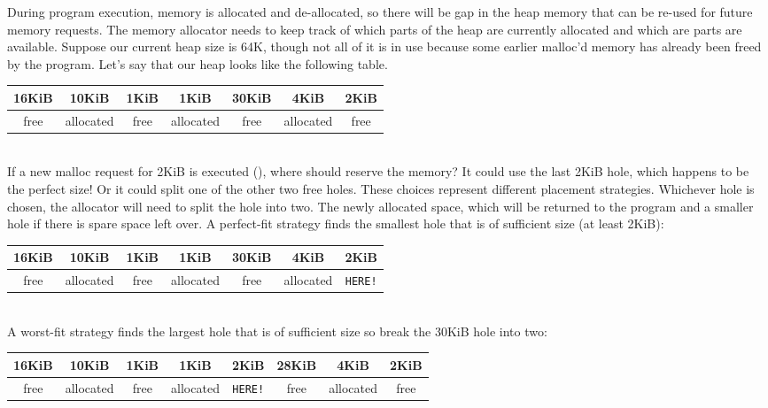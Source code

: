 During program execution, memory is allocated and de-allocated, so there will be gap in the heap memory that can be re-used for future memory requests.
The memory allocator needs to keep track of which parts of the heap are currently allocated and which are parts are available.
Suppose our current heap size is 64K, though not all of it is in use because some earlier malloc'd memory has already been freed by the program.
Let's say that our heap looks like the following table.
\\
\begin{center}
\begin{tabular}{ | c | c | c | c | c | c | c | }
\hline
16KiB & 10KiB & 1KiB & 1KiB & 30KiB & 4KiB & 2KiB \\ \hline
free & allocated & free & allocated & free & allocated & free \\
\hline
\end{tabular}
\end{center}
\\
If a new malloc request for 2KiB is executed (), where should  reserve the memory?
It could use the last 2KiB hole, which happens to be the perfect size!
Or it could split one of the other two free holes.
These choices represent different placement strategies.
Whichever hole is chosen, the allocator will need to split the hole into two.
The newly allocated space, which will be returned to the program and a smaller hole if there is spare space left over.
A perfect-fit strategy finds the smallest hole that is of sufficient size (at least 2KiB):
\\
\begin{center}
\begin{tabular}{ | c | c | c | c | c | c | c | }
\hline
16KiB & 10KiB & 1KiB & 1KiB & 30KiB & 4KiB & 2KiB \\ \hline
free & allocated & free & allocated & free & allocated & \texttt{HERE!} \\
\hline
\end{tabular}
\end{center}
\\
A worst-fit strategy finds the largest hole that is of sufficient size so break the 30KiB hole into two:
\\
\begin{center}
\begin{tabular}{ | c | c | c | c | c | c | c | c | }
\hline
16KiB & 10KiB & 1KiB & 1KiB & 2KiB & 28KiB & 4KiB & 2KiB \\ \hline
free & allocated & free & allocated & \texttt{HERE!} & free & allocated & free \\
\hline
\end{tabular}
\end{center}
